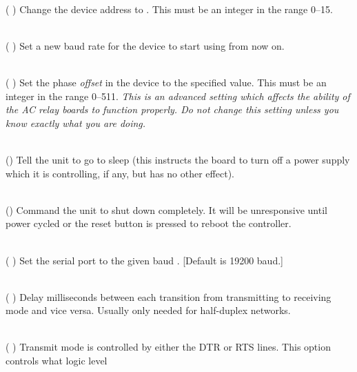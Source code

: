 \begin{list}{}{}
\item[{\codetype{----set--address=}\Var*{addr}}]\hfill\\
(
)
Change the device address to
.
This must be an integer in the range 0--15.
\item[{\codetype{----set--baud--rate=}\Var*{speed}}]\hfill\\
(
)
Set a new baud rate for the device to start using from now on.
\item[{\codetype{----set--phase=}\Var*{offset}}]\hfill\\
(
)
Set the phase 
\emph{offset}
in the device to the specified value.  This must be an integer in the range 0--511.
\emph{This is an advanced setting which affects the ability of the AC relay boards to}
\emph{function properly. Do not change this setting unless you know exactly what you are doing.}
\item[{\codetype{----sleep}}]\hfill\\
()
Tell the unit to go to sleep (this instructs the board to turn off a
power supply which it is controlling, if any, but has no other effect).
\item[{\codetype{----shutdown}}]\hfill\\
()
Command the unit to shut down completely.  It will be unresponsive until
power cycled or the reset button is pressed to reboot the controller.
\item[{\codetype{----speed=}\Var*{rate}}]\hfill\\
(
)
Set the serial port to the given
baud
.
[Default is 19200 baud.]
\item[{\codetype{----txdelay=}\Var*{mS}}]\hfill\\
(
)
Delay 
milliseconds between each transition from transmitting to receiving mode and vice versa.
Usually only needed for half-duplex networks.
\item[{\codetype{----txlevel=}\Var*{level}}]\hfill\\
(
)
Transmit mode is controlled by either the DTR or RTS lines.  This option controls what logic level

\end{list}
